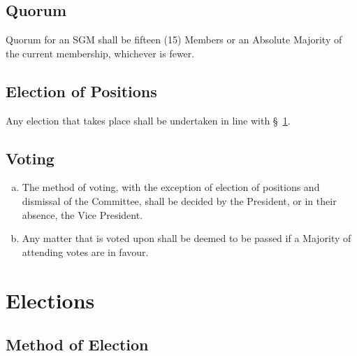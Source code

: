 \documentclass[a4paper,12pt]{article}
\begin{document}
\subsection{Quorum}

Quorum for an SGM shall be fifteen (15) Members or an Absolute Majority of the current membership, whichever is fewer.

\subsection{Election of Positions}

Any election that takes place shall be undertaken in line with \S~\ref{elections}.

\subsection{Voting}

\begin{enumerate}[a)]
	\item The method of voting, with the exception of election of positions and dismissal of the Committee, shall be decided by the President, or in their absence, the Vice President.
	\item Any matter that is voted upon shall be deemed to be passed if a Majority of attending votes are in favour.
\end{enumerate}

\section{Elections}
\label{elections}

\subsection{Method of Election}
\end{document}
